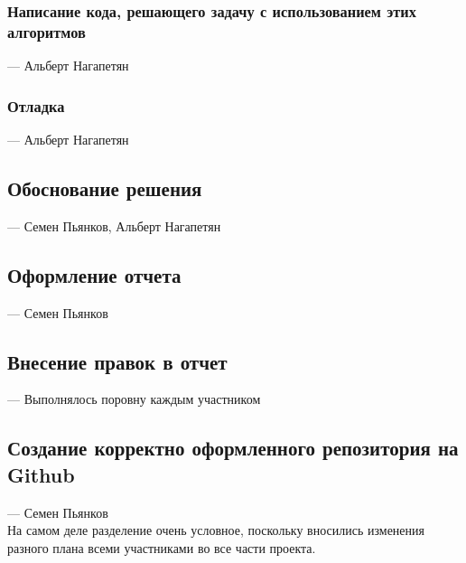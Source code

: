 \documentclass{article}
\begin{document}
    \subsubsection{Написание кода, решающего задачу с использованием этих алгоритмов} --- Альберт Нагапетян
    \subsubsection{Отладка} --- Альберт Нагапетян %
\subsection{Обоснование решения} --- Семен Пьянков, Альберт Нагапетян
\subsection{Оформление отчета} --- Семен Пьянков
\subsection{Внесение правок в отчет} --- Выполнялось поровну каждым участником
\subsection{Создание корректно оформленного репозитория на Github} --- Семен Пьянков\\

На самом деле разделение очень условное, поскольку вносились изменения разного плана всеми участниками во все части проекта.\\
\end{document}
